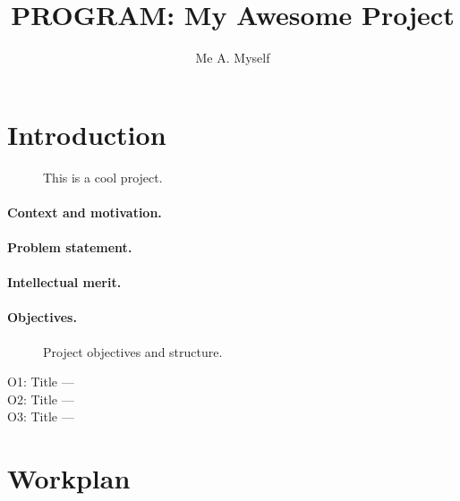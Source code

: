 \documentclass{nsf}
\title{PROGRAM: My Awesome Project}
\author{Me A. Myself}
\begin{document}
\maketitle

\section{Introduction}
\label{sec:introduction}

\begin{wrapfigure}[14]{r}{.5\textwidth}
  \centering
  \caption{This is a cool project.}
  \label{fig:concept}
\end{wrapfigure}
\paragraph{Context and motivation.}
\lipsum[1]

\paragraph{Problem statement.}
\lipsum[1]

\paragraph{Intellectual merit.}
\lipsum[1]

\paragraph{Objectives.}
\lipsum[1]
\begin{figure}[t]
  \centering
  \caption{Project objectives and structure.}
  \label{fig:objectives}
\end{figure}

\begin{description}
\item[O1: Title —] \lipsum[1]
\item[O2: Title —] \lipsum[1]
\item[O3: Title —] \lipsum[1]
\end{description}

\section{Workplan}
\label{sec:workplan}
\end{document}
